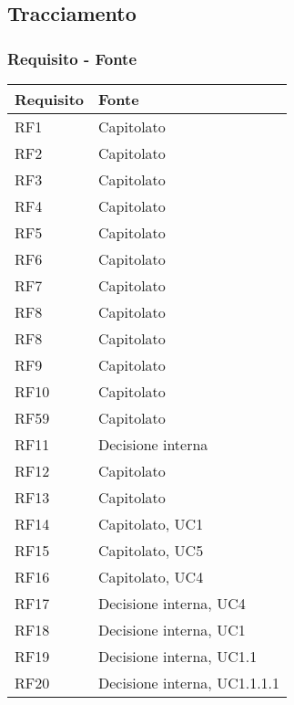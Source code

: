 \subsection{Tracciamento}

\subsubsection{Requisito - Fonte}

\begin{center}
    \begin{longtable}{|C{5cm}|C{5cm}|}
        \hline
        \textbf{Requisito} & \textbf{Fonte} \\
        \hline
        RF1 & Capitolato \\
        \hline
        RF2 & Capitolato \\
        \hline
        RF3 & Capitolato \\
        \hline
        RF4 & Capitolato \\
        \hline
        RF5 & Capitolato \\
        \hline
        RF6 & Capitolato \\
        \hline
        RF7 & Capitolato \\
        \hline
        RF8 & Capitolato \\
        \hline
        RF8 & Capitolato \\
        \hline
        RF9 & Capitolato \\
        \hline
        RF10 & Capitolato \\
        \hline
        RF59 & Capitolato \\
        \hline
        RF11 & Decisione interna \\
        \hline
        RF12 & Capitolato \\
        \hline
        RF13 & Capitolato \\
        \hline
        RF14 & Capitolato, UC1 \\
        \hline
        RF15 & Capitolato, UC5 \\
        \hline
        RF16 & Capitolato, UC4 \\
        \hline
        RF17 & Decisione interna, UC4 \\
        \hline
        RF18 & Decisione interna, UC1 \\
        \hline
        RF19 & Decisione interna, UC1.1 \\
        \hline
        RF20 & Decisione interna, UC1.1.1.1 \\

\end{longtable}
\end{center}
